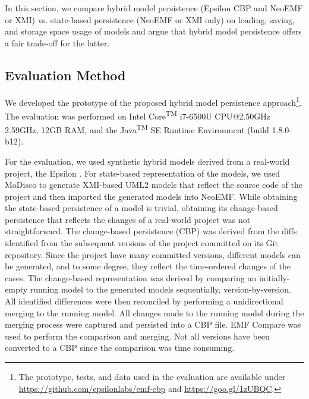 \documentclass[10pt,conference]{IEEEtran}
\begin{document}
In this section, we compare hybrid model persistence (Epsilon CBP and NeoEMF or XMI) vs. state-based persistence (NeoEMF or XMI only) on loading, saving, and storage space usage of models and argue that hybrid model persistence offers a fair trade-off for the latter. 

\subsection{Evaluation Method}
\label{sec:evaluation_method}
We developed the prototype of the proposed hybrid model persistence approach\footnote{The prototype, tests, and data used in the evaluation are available under \url{https://github.com/epsilonlabs/emf-cbp} and \url{https://goo.gl/1zUBQC}.}. The evaluation was performed on Intel\textsuperscript{\textregistered} Core\textsuperscript{TM} i7-6500U CPU@2.50GHz 2.59GHz, 12GB RAM, and the Java\textsuperscript{TM} SE Runtime Environment (build 1.8.0-b12).

For the evaluation, we used synthetic hybrid models derived from a real-world project, the Epsilon \cite{eclipse2017epsilon,eclipse2018epsilongit}. For state-based representation of the models, we used MoDisco \cite{DBLP:journals/infsof/BruneliereCDM14} to generate XMI-based UML2 \cite{eclipse2017uml2} models that reflect the source code of the project and then imported the generated models into NeoEMF. While obtaining the state-based persistence of a model is trivial, obtaining its change-based persistence that reflects the changes of a real-world project was not straightforward. The change-based persistence (CBP) was derived from the diffs identified from the subsequent versions of the project committed on its Git repository. Since the project have many committed versions, different models can be generated, and to some degree, they reflect the time-ordered changes of the cases. The change-based representation was derived by comparing an initially-empty running model to the generated models sequentially, version-by-version. All identified differences were then reconciled by performing a unidirectional merging to the running model. All changes made to the running model during the merging process were captured and persisted into a CBP file. EMF Compare was used \cite{eclipse2017compare} to perform the comparison and merging. Not all versions have been converted to a CBP since the comparison was time consuming.  
\end{document}
